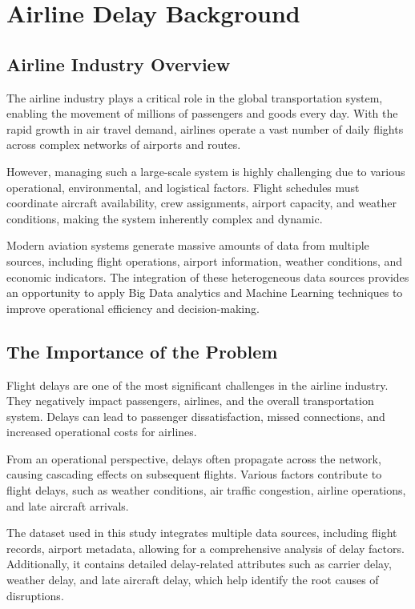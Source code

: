 \documentclass[12pt,a4paper]{report}
\begin{document}
\section{Airline Delay Background}

\subsection{Airline Industry Overview}

The airline industry plays a critical role in the global transportation system, enabling the movement of millions of passengers and goods every day. With the rapid growth in air travel demand, airlines operate a vast number of daily flights across complex networks of airports and routes.

However, managing such a large-scale system is highly challenging due to various operational, environmental, and logistical factors. Flight schedules must coordinate aircraft availability, crew assignments, airport capacity, and weather conditions, making the system inherently complex and dynamic.

Modern aviation systems generate massive amounts of data from multiple sources, including flight operations, airport information, weather conditions, and economic indicators. The integration of these heterogeneous data sources provides an opportunity to apply Big Data analytics and Machine Learning techniques to improve operational efficiency and decision-making.

\subsection{The Importance of the Problem}

Flight delays are one of the most significant challenges in the airline industry. They negatively impact passengers, airlines, and the overall transportation system. Delays can lead to passenger dissatisfaction, missed connections, and increased operational costs for airlines.

From an operational perspective, delays often propagate across the network, causing cascading effects on subsequent flights. Various factors contribute to flight delays, such as weather conditions, air traffic congestion, airline operations, and late aircraft arrivals.

The dataset used in this study integrates multiple data sources, including flight records, airport metadata, allowing for a comprehensive analysis of delay factors. Additionally, it contains detailed delay-related attributes such as carrier delay, weather delay, and late aircraft delay, which help identify the root causes of disruptions.
\end{document}
